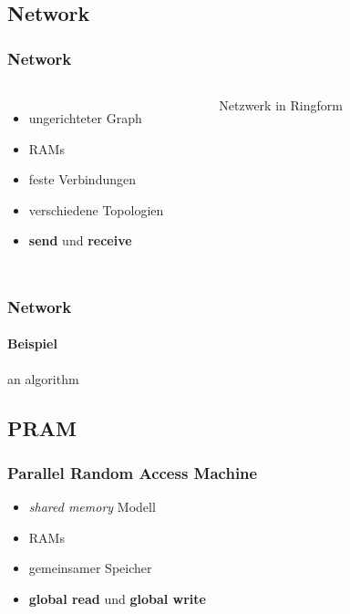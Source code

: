 \subsection{Network}
\begin{frame}
    \frametitle{Network}
    \begin{columns}
        \begin{itemize}
            \item ungerichteter Graph
            \item RAMs
            \item feste Verbindungen
            \item verschiedene Topologien
            \item \textbf{send} und \textbf{receive}
        \end{itemize}
        \begin{figure}
            \centering
            
            \caption{Netzwerk in Ringform}
        \end{figure}
    \end{columns}
\end{frame}

\begin{frame}
    \frametitle{Network}
    \framesubtitle{Beispiel}
    an algorithm
\end{frame}

\subsection{PRAM}
\begin{frame}
    \frametitle{Parallel Random Access Machine}
    \begin{itemize}
        \item \emph{shared memory} Modell
        \item RAMs
        \item gemeinsamer Speicher
        \item \textbf{global read} und \textbf{global write}
    \end{itemize}
\end{frame}

